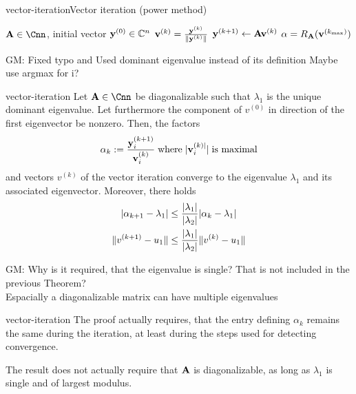 \begin{Algorithm*}{vector-iteration}{Vector iteration (power method)}
  \begin{algorithmic}[1]
    \Require $\mata\in\Cnn$, initial vector $\mathbf y^{(0)}\in\mathbb C^n$
    \State $\mathbf v^{(k)} = \frac{\mathbf y^{(k)}}{\lVert\mathbf y^{(k)}\rVert}$
    \State $\mathbf y^{(k+1)} \gets \mathbf A \mathbf v^{(k)}$
    \EndFor
    \State $\alpha = R_\mathbf A(\mathbf v^{(k_{\max})})$
  \end{algorithmic}
\end{Algorithm*}

\begin{todo}
  GM:
  Fixed typo and
  Used dominant eigenvalue instead of its definition
  Maybe use argmax for i?
\end{todo}
\begin{Theorem}{vector-iteration}
  Let $\mata\in\Cnn$ be diagonalizable such that $\lambda_1$ is the
  unique dominant eigenvalue. Let furthermore the
  component of $v^{(0)}$ in direction of the first eigenvector be
  nonzero. Then, the factors
  \[\alpha_k := \frac{\mathbf y^{(k+1)}_i}{\mathbf v_i^{(k)}} \; \text{where} \; |\mathbf v_i^{(k)|}| \; \text{is maximal}\]
  and vectors $v^{(k)}$ of the
  vector iteration converge to the eigenvalue $\lambda_1$ and its
  associated eigenvector. Moreover, there holds
  \begin{align}
    \lvert\alpha_{k+1}-\lambda_1\rvert
    &\le \frac{\lvert\lambda_1\rvert}{\lvert\lambda_2\rvert} \lvert\alpha_{k}-\lambda_1\rvert\\
    \lVert v^{(k+1)}-u_1\rVert
    &\le \frac{\lvert\lambda_1\rvert}{\lvert\lambda_2\rvert} \lVert v^{(k)}-u_1\rVert
  \end{align}
\end{Theorem}

\begin{todo}
  GM:
  Why is it required, that the eigenvalue is single? That is not included in the previous Theorem? \\
  Espacially a diagonalizable matrix can have multiple eigenvalues
\end{todo}
\begin{Remark}{vector-iteration}
  The proof actually requires, that the entry defining $\alpha_k$
  remains the same during the iteration, at least during the steps
  used for detecting convergence.

  The result does not actually require that $\mathbf A$ is diagonalizable,
  as long as $\lambda_1$ is single and of largest modulus.
\end{Remark}

